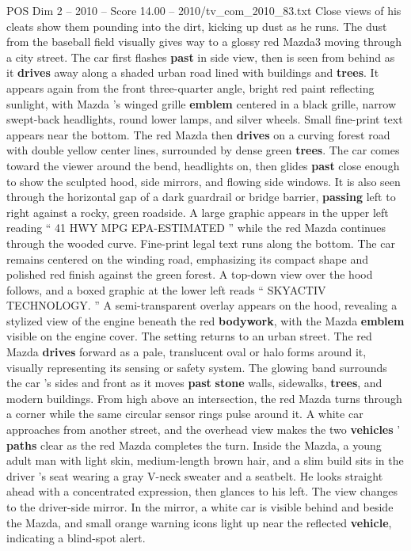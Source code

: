 \begin{textsample}{POS Dim 2 – 2010 – Score 14.00 – 2010/tv\_com\_2010\_83.txt}
Close views of his cleats show them pounding into the dirt, kicking up dust as he runs.
The dust from the baseball field visually gives way to a glossy red Mazda3 moving through a city street.
The car first flashes \textbf{past} in side view, then is seen from behind as it \textbf{drives} away along a shaded urban road lined with buildings and \textbf{trees}.
It appears again from the front three-quarter angle, bright red paint reflecting sunlight, with Mazda ’s winged grille \textbf{emblem} centered in a black grille, narrow swept-back headlights, round lower lamps, and silver wheels.
Small fine-print text appears near the bottom.
The red Mazda then \textbf{drives} on a curving forest road with double yellow center lines, surrounded by dense green \textbf{trees}.
The car comes toward the viewer around the bend, headlights on, then glides \textbf{past} close enough to show the sculpted hood, side mirrors, and flowing side windows.
It is also seen through the horizontal gap of a dark guardrail or bridge barrier, \textbf{passing} left to right against a rocky, green roadside.
A large graphic appears in the upper left reading “ 41 HWY MPG EPA-ESTIMATED ” while the red Mazda continues through the wooded curve.
Fine-print legal text runs along the bottom.
The car remains centered on the winding road, emphasizing its compact shape and polished red finish against the green forest.
A top-down view over the hood follows, and a boxed graphic at the lower left reads “ SKYACTIV TECHNOLOGY. ” A semi-transparent overlay appears on the hood, revealing a stylized view of the engine beneath the red \textbf{bodywork}, with the Mazda \textbf{emblem} visible on the engine cover.
The setting returns to an urban street.
The red Mazda \textbf{drives} forward as a pale, translucent oval or halo forms around it, visually representing its sensing or safety system.
The glowing band surrounds the car ’s sides and front as it moves \textbf{past} \textbf{stone} walls, sidewalks, \textbf{trees}, and modern buildings.
From high above an intersection, the red Mazda turns through a corner while the same circular sensor rings pulse around it.
A white car approaches from another street, and the overhead view makes the two \textbf{vehicles} ’ \textbf{paths} clear as the red Mazda completes the turn.
Inside the Mazda, a young adult man with light skin, medium-length brown hair, and a slim build sits in the driver ’s seat wearing a gray V-neck sweater and a seatbelt.
He looks straight ahead with a concentrated expression, then glances to his left.
The view changes to the driver-side mirror.
In the mirror, a white car is visible behind and beside the Mazda, and small orange warning icons light up near the reflected \textbf{vehicle}, indicating a blind-spot alert.

\end{textsample}
